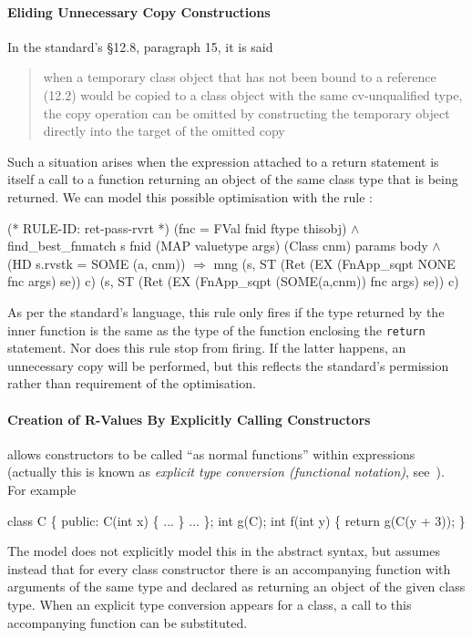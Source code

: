 \documentclass[11pt]{article}
\begin{document}
\paragraph{Eliding Unnecessary Copy Constructions} In the standard's
\S12.8, paragraph 15, it is said
\begin{quote}when a temporary class object that has not been bound to
  a reference (12.2) would be copied to a class object with the same
  cv-unqualified type, the copy operation can be omitted by
  constructing the temporary object directly into the target of the
  omitted copy
\end{quote}
Such a situation arises when the expression attached to a return
statement is itself a call to a function returning an object of the
same class type that is being returned.  We can model this possible
optimisation with the rule :%
\begin{stdrule}
(* RULE-ID: ret-pass-rvrt *)
     (fnc = FVal fnid ftype thisobj) \(\land\)
     find_best_fnmatch s fnid (MAP valuetype args)
                       (Class cnm) params body \(\land\)
     (HD s.rvstk = SOME (a, cnm))
   \(\Rightarrow\)
     mng (s, ST (Ret (EX (FnApp_sqpt NONE fnc args) se)) c)
         (s, ST (Ret (EX (FnApp_sqpt (SOME(a,cnm)) fnc args)
                         se))
                c)
\end{stdrule}
As per the standard's language, this rule only fires if the type
returned by the inner function is the same as the type of the function
enclosing the \texttt{return} statement.  Nor does this rule stop
 from firing.  If the latter happens, an
unnecessary copy will be performed, but this reflects the standard's
permission rather than requirement of the optimisation.

\paragraph{Creation of R-Values By Explicitly Calling Constructors}
%
\cpp{} allows constructors to be called ``as normal functions'' within
expressions (actually this is known as \emph{explicit type conversion
  (functional notation)}, see~\cite[\S5.2.3]{cpp-standard-iso14882}).
For example
\begin{stdrule}
   class C \{
   public:
     C(int x) \{ ... \}
     ...
   \};
   int g(C);
   int f(int y)
   \{
      return g(C(y + 3));
   \}
\end{stdrule}
The model does not explicitly model this in the abstract syntax, but
assumes instead that for every class constructor there is an
accompanying function with arguments of the same type and declared as
returning an object of the given class type.  When an explicit type
conversion appears for a class, a call to this accompanying function
can be substituted.
\end{document}
